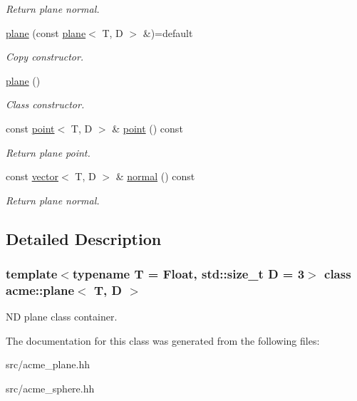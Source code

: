 \begin{DoxyCompactItemize}
\begin{DoxyCompactList}\small\item\em Return plane normal. \end{DoxyCompactList}\item 
\mbox{\label{classacme_1_1plane_a2e6f6a6899f7b4212e42e87e5f5b3cf9}} 
\hyperlink{classacme_1_1plane_a2e6f6a6899f7b4212e42e87e5f5b3cf9}{plane} (const \hyperlink{classacme_1_1plane}{plane}$<$ T, D $>$ \&)=default
\begin{DoxyCompactList}\small\item\em Copy constructor. \end{DoxyCompactList}\item 
\mbox{\label{classacme_1_1plane_a63e74db85cea2b9a290ff71fc85ec874}} 
\hyperlink{classacme_1_1plane_a63e74db85cea2b9a290ff71fc85ec874}{plane} ()
\begin{DoxyCompactList}\small\item\em Class constructor. \end{DoxyCompactList}\item 
\mbox{\label{classacme_1_1plane_a1493555a6c7db6dc050dac80d5d7a046}} 
const \hyperlink{classacme_1_1point}{point}$<$ T, D $>$ \& \hyperlink{classacme_1_1plane_a1493555a6c7db6dc050dac80d5d7a046}{point} () const
\begin{DoxyCompactList}\small\item\em Return plane point. \end{DoxyCompactList}\item 
\mbox{\label{classacme_1_1plane_aa01e59b940e48eeb36fdd6fac5d5ca05}} 
const \hyperlink{classacme_1_1vector}{vector}$<$ T, D $>$ \& \hyperlink{classacme_1_1plane_aa01e59b940e48eeb36fdd6fac5d5ca05}{normal} () const
\begin{DoxyCompactList}\small\item\em Return plane normal. \end{DoxyCompactList}\end{DoxyCompactItemize}


\subsection{Detailed Description}
\subsubsection*{template$<$typename T = Float, std\+::size\+\_\+t D = 3$>$\newline
class acme\+::plane$<$ T, D $>$}

ND plane class container. 

The documentation for this class was generated from the following files\+:\begin{DoxyCompactItemize}
\item 
src/acme\+\_\+plane.\+hh\item 
src/acme\+\_\+sphere.\+hh\end{DoxyCompactItemize}
